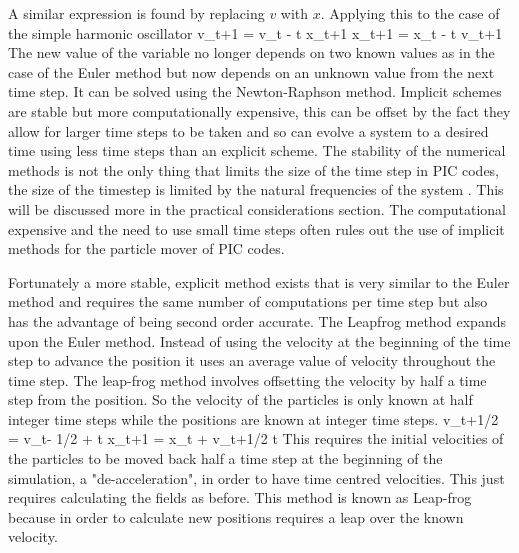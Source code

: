 \ee 
A similar expression is found by replacing $v$ with $x$. Applying this to the case of the simple harmonic oscillator 
\be 
v_{t+1} = v_t - \Delta t x_{t+1} 
\ee 
\be 
x_{t+1} = x_t - \Delta t v_{t+1} 
\ee
The new value of the variable no longer depends on two known values as in the case of the Euler method but now depends on an unknown value from the next time step. It can be solved using the Newton-Raphson method. Implicit schemes are stable but more computationally expensive, this can be offset by the fact they allow for larger time steps to be taken and so can evolve a system to a desired time using less time steps than an explicit scheme. The stability of the numerical methods is not the only thing that limits the size of the time step in PIC codes, the size of the timestep is limited by the natural frequencies of the system \cite{Hockney1981}. This will be discussed more in the practical considerations section. The computational expensive and the need to use small time steps often rules out the use of implicit methods for the particle mover of PIC codes. 


Fortunately a more stable, explicit  method exists that is very similar to the Euler method and requires the same number of computations per time step but also has the advantage of being second order accurate. The Leapfrog method expands upon the Euler method. Instead of using the velocity at the beginning of the time step to advance the position it uses an average value of velocity throughout the time step. The leap-frog method involves offsetting the velocity by half a time step from the position. So the velocity of the particles is only known at half integer time steps while the positions are known at integer time steps. 
\be 
v_{t+1/2} = v_{t- 1/2} +  \Delta t
\ee
\be 
x_{t+1} = x_{t} + v_{t+1/2} \Delta t
\ee 
This requires the initial velocities of the particles to be moved back half a time step at the beginning of the simulation, a "de-acceleration", in order to have time centred velocities. This just requires calculating the fields as before. This method is known as Leap-frog because in order to calculate new positions requires a leap over the known velocity. 

